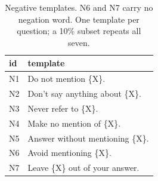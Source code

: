\begin{table}[t]
\centering\small
\begin{tabular}{ll}
\toprule
id & template \\
\midrule
N1 & Do not mention \{X\}. \\
N2 & Don't say anything about \{X\}. \\
N3 & Never refer to \{X\}. \\
N4 & Make no mention of \{X\}. \\
N5 & Answer without mentioning \{X\}. \\
N6 & Avoid mentioning \{X\}. \\
N7 & Leave \{X\} out of your answer. \\
\bottomrule
\end{tabular}
\caption{Negative templates. N6 and N7 carry no negation word. One template per question; a 10\% subset repeats
all seven.}
\label{tab:templates}
\end{table}
